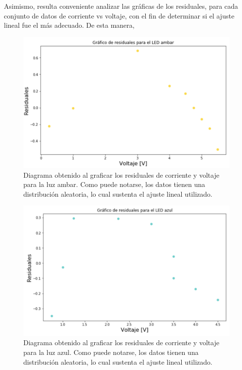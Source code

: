 \documentclass[%
 reprint,
 amsmath,amssymb,
 aps,
]{revtex4-1}
\begin{document}
Asimismo, resulta conveniente analizar las gráficas de los residuales, para cada conjunto de datos de corriente vs voltaje, con el fin de determinar si el ajuste lineal fue el más adecuado. De esta manera, 

\begin{figure}[H]
    \centering
    \includegraphics[scale= 0.34]{resLEDambar.png}
    \caption{Diagrama obtenido al graficar los residuales de corriente y voltaje para la luz ambar. Como puede notarse, los datos tienen una distribución aleatoria, lo cual sustenta el ajuste lineal utilizado.}
    \label{fig:ambarRes}
\end{figure}

\begin{figure}[H]
    \centering
    \includegraphics[scale= 0.34]{resLEDazul.png}
    \caption{Diagrama obtenido al graficar los residuales de corriente y voltaje para la luz azul. Como puede notarse, los datos tienen una distribución aleatoria, lo cual sustenta el ajuste lineal utilizado.}
    \label{fig:ambarRes}
\end{figure}
\end{document}

